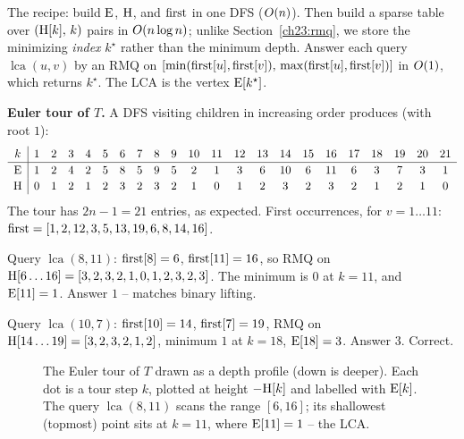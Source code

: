 The recipe: build $\mathrm{E}$, $\mathrm{H}$, and $\mathrm{first}$ in one DFS ($O(n)$). Then build a sparse table over
$(\mathrm{H}[k],\,k)$ pairs in $O(n\log n)$; unlike Section~\ref{ch23:rmq}, we store the minimizing \emph{index} $k^\star$ rather than the minimum depth.
Answer each query $\operatorname{lca}(u,v)$ by an RMQ on
$[\min(\mathrm{first}[u],\mathrm{first}[v]),\,\max(\mathrm{first}[u],\mathrm{first}[v])]$ in $O(1)$, which returns $k^\star$. The LCA is the vertex $\mathrm{E}[k^\star]$.

\begin{labbox}
\textbf{Euler tour of $T$.} A DFS visiting children in increasing order produces (with root
$1$):
\[
\renewcommand{\arraystretch}{1.15}
\begin{array}{c|ccccccccccccccccccccc}
k    & 1&2&3&4&5&6&7&8&9&10&11&12&13&14&15&16&17&18&19&20&21\\\hline
\eu  & 1&2&4&2&5&8&5&9&5&2 &1 &3 &6 &10&6 &11&6 &3 &7 &3 &1\\
\de  & 0&1&2&1&2&3&2&3&2&1 &0 &1 &2 &3 &2 &3 &2 &1 &2 &1 &0
\end{array}
\]
The tour has $2n-1=21$ entries, as expected. First occurrences, for $v=1\ldots 11$:
$\mathrm{first}=[1,2,12,3,5,13,19,6,8,14,16]$.

Query $\operatorname{lca}(8,11)$: $\mathrm{first}[8]=6$, $\mathrm{first}[11]=16$, so RMQ on
$\mathrm{H}[6\ldots16]=[3,2,3,2,1,0,1,2,3,2,3]$. The minimum is $0$ at $k=11$, and $\mathrm{E}[11]=1$.
Answer $1$ -- matches binary lifting.

Query $\operatorname{lca}(10,7)$: $\mathrm{first}[10]=14$, $\mathrm{first}[7]=19$, RMQ on
$\mathrm{H}[14\ldots19]=[3,2,3,2,1,2]$, minimum $1$ at $k=18$, $\mathrm{E}[18]=3$. Answer $3$. Correct.
\end{labbox}

\begin{figure}[H]
\centering
{}
\caption{The Euler tour of $T$ drawn as a depth profile (down is deeper). Each dot is a tour
step $k$, plotted at height $-\mathrm{H}[k]$ and labelled with $\mathrm{E}[k]$. The query
$\operatorname{lca}(8,11)$ scans the range $[6,16]$; its shallowest (topmost) point sits at
$k=11$, where $\mathrm{E}[11]=1$ -- the LCA.}
\label{ch23:fig-euler}
\end{figure}


